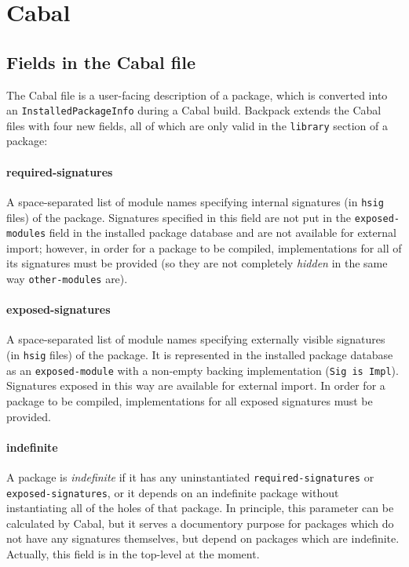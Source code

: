 \documentclass{article}
\newcommand{\Red}[1]{{\color{red} #1}}
\begin{document}
\section{Cabal}

\subsection{Fields in the Cabal file}

The Cabal file is a user-facing description of a package, which is
converted into an \texttt{InstalledPackageInfo} during a Cabal build.
Backpack extends the Cabal files with four new fields, all of which
are only valid in the \texttt{library} section of a package:

\paragraph{required-signatures}  A space-separated list of module names
specifying internal signatures (in \texttt{hsig} files) of the package.
\Red{Signatures specified in this field are not put in the \texttt{exposed-modules} field in the installed package database and
are not available for external import}; however, in order for a package to be
compiled, implementations for all of its signatures must be provided (so
they are not completely \emph{hidden} in the same way \texttt{other-modules} are).

\paragraph{exposed-signatures}  A space-separated list of module names
specifying externally visible signatures (in \texttt{hsig} files) of the package.  It is
represented in the installed package database as an \texttt{exposed-module} with a
non-empty backing implementation (\texttt{Sig is Impl}). Signatures exposed in this way are
available for external import.  In order for a package to be compiled,
implementations for all exposed signatures must be provided.

\paragraph{indefinite}  A package is \emph{indefinite} if it has any
uninstantiated
\texttt{required-signatures} or \texttt{exposed-signatures}, or it
depends on an indefinite package without instantiating all of the holes
of that package.  In principle, this parameter can be calculated
by Cabal, but it serves a documentory purpose for packages which do not
have any signatures themselves, but depend on packages which are indefinite.
\Red{Actually, this field is in the top-level at the moment.}
\end{document}
